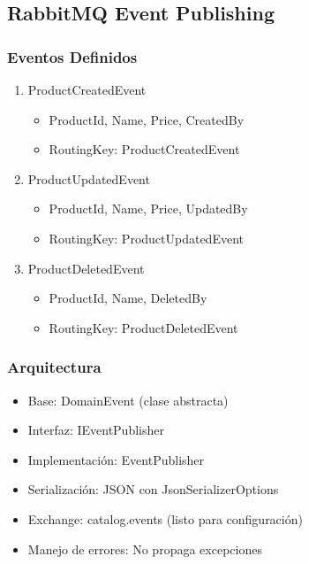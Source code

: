 \documentclass[12pt,a4paper]{article}
\begin{document}
\subsection{RabbitMQ Event Publishing}

\subsubsection{Eventos Definidos}

\begin{enumerate}
    \item ProductCreatedEvent
    \begin{itemize}
        \item ProductId, Name, Price, CreatedBy
        \item RoutingKey: ProductCreatedEvent
    \end{itemize}
    \item ProductUpdatedEvent
    \begin{itemize}
        \item ProductId, Name, Price, UpdatedBy
        \item RoutingKey: ProductUpdatedEvent
    \end{itemize}
    \item ProductDeletedEvent
    \begin{itemize}
        \item ProductId, Name, DeletedBy
        \item RoutingKey: ProductDeletedEvent
    \end{itemize}
\end{enumerate}

\subsubsection{Arquitectura}

\begin{itemize}
    \item Base: DomainEvent (clase abstracta)
    \item Interfaz: IEventPublisher
    \item Implementación: EventPublisher
    \item Serialización: JSON con JsonSerializerOptions
    \item Exchange: catalog.events (listo para configuración)
    \item Manejo de errores: No propaga excepciones
\end{itemize}
\end{document}
